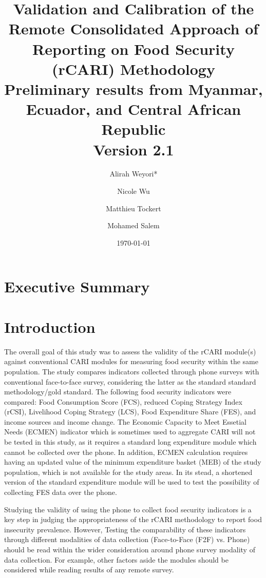 \documentclass[11pt,harvard]{article}
\author{Alirah Weyori* \and Nicole Wu \and Matthieu Tockert \and Mohamed Salem}
\date{\today}
\title{Validation and Calibration of the Remote Consolidated Approach of Reporting on Food Security (rCARI) Methodology 
	\\ {\normalsize Preliminary results from Myanmar, Ecuador, and Central African Republic} 
	\\{\normalsize{Version 2.1}} }
\begin{document}
	\maketitle \vspace{-1cm}
	\onehalfspacing
	\pagebreak
	\setlength{\parskip}{8pt} %
	
	\tableofcontents
	\pagebreak
	

\section{Executive Summary}


\pagebreak
	
\section{Introduction}

The overall goal of this study was to assess the validity of the rCARI module(s) against conventional CARI modules for measuring food security within the same population. The study compares indicators collected through phone surveys with conventional face-to-face survey, considering the latter as the standard standard methodology/gold standard. The following food security indicators were compared: Food Consumption Score (FCS), reduced Coping Strategy Index (rCSI), Livelihood Coping Strategy (LCS), Food Expenditure Share (FES), and income sources and income change. The Economic Capacity to Meet Essetial Needs (ECMEN) indicator which is sometimes used to aggregate CARI will not be tested in this study, as it requires a standard long expenditure module which cannot be collected over the phone. In addition, ECMEN calculation requires having an updated value of the minimum expenditure basket (MEB) of the study population, which is not available for the study areas. In its stead, a shortened version of the standard expenditure module will be used to test the possibility of collecting FES data over the phone.

Studying the validity of using the phone to collect food security indicators is a key step in judging the appropriateness of the rCARI methodology to report food insecurity prevalence. However, Testing the comparability of these indicators through different modalities of data collection (Face-to-Face (F2F) vs. Phone) should be read within the wider consideration around phone survey modality of data collection. For example, other factors aside the modules should be considered while reading results of any remote survey.
\end{document}
